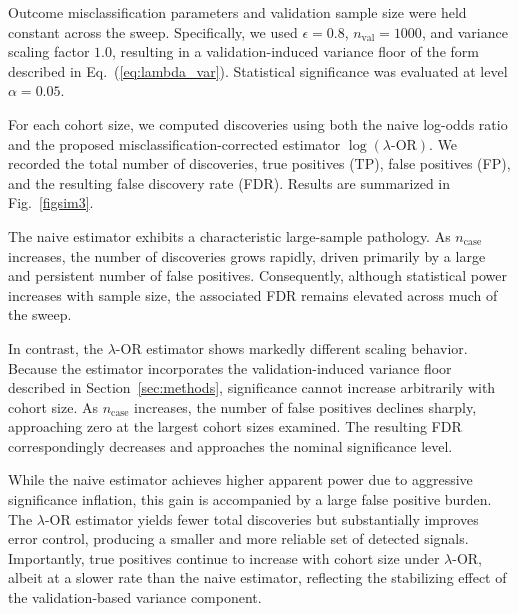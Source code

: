 \documentclass[pdflatex,sn-mathphys-num]{sn-jnl}%
\theoremstyle{thmstyleone}%
\theoremstyle{thmstyletwo}%
\theoremstyle{thmstylethree}%
\begin{document}
Outcome misclassification parameters and validation sample size were held constant across the sweep. Specifically, we used $\epsilon = 0.8$, $n_{\mathrm{val}} = 1000$, and variance scaling factor $1.0$, resulting in a validation-induced variance floor of the form described in Eq.~(\ref{eq:lambda_var}). Statistical significance was evaluated at level $\alpha = 0.05$.

For each cohort size, we computed discoveries using both the naive log-odds ratio and the proposed misclassification-corrected estimator $\log(\lambda\text{-OR})$. We recorded the total number of discoveries, true positives (TP), false positives (FP), and the resulting false discovery rate (FDR). Results are summarized in Fig.~\ref{figsim3}.

The naive estimator exhibits a characteristic large-sample pathology. As $n_{\mathrm{case}}$ increases, the number of discoveries grows rapidly, driven primarily by a large and persistent number of false positives. Consequently, although statistical power increases with sample size, the associated FDR remains elevated across much of the sweep.

In contrast, the $\lambda$-OR estimator shows markedly different scaling behavior. Because the estimator incorporates the validation-induced variance floor described in Section~\ref{sec:methods}, significance cannot increase arbitrarily with cohort size. As $n_{\mathrm{case}}$ increases, the number of false positives declines sharply, approaching zero at the largest cohort sizes examined. The resulting FDR correspondingly decreases and approaches the nominal significance level.

While the naive estimator achieves higher apparent power due to aggressive significance inflation, this gain is accompanied by a large false positive burden. The $\lambda$-OR estimator yields fewer total discoveries but substantially improves error control, producing a smaller and more reliable set of detected signals. Importantly, true positives continue to increase with cohort size under $\lambda$-OR, albeit at a slower rate than the naive estimator, reflecting the stabilizing effect of the validation-based variance component.
\end{document}
